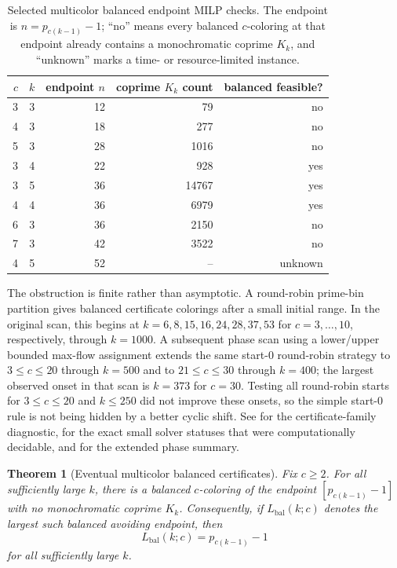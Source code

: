 \documentclass[11pt]{article}
\theoremstyle{plain}
\newtheorem{theorem}{Theorem}[section]
\theoremstyle{definition}
\theoremstyle{remark}
\begin{document}
\begin{table}[htbp]
\centering
\caption{Selected multicolor balanced endpoint MILP checks.  The endpoint
is $n=p_{c(k-1)}-1$; ``no'' means every balanced $c$-coloring at that
endpoint already contains a monochromatic coprime $K_k$, and ``unknown'' marks
a time- or resource-limited instance.}
\label{tab:balanced-multicolor-endpoint}
\small
\begin{tabular}{@{}rrrrr@{}}
\toprule
$c$ & $k$ & endpoint $n$ & coprime $K_k$ count & balanced feasible? \\
\midrule
3 & 3 & 12 & 79 & no \\
4 & 3 & 18 & 277 & no \\
5 & 3 & 28 & 1016 & no \\
3 & 4 & 22 & 928 & yes \\
3 & 5 & 36 & 14767 & yes \\
4 & 4 & 36 & 6979 & yes \\
6 & 3 & 36 & 2150 & no \\
7 & 3 & 42 & 3522 & no \\
4 & 5 & 52 & -- & unknown \\
\bottomrule
\end{tabular}

\end{table}

The obstruction is finite rather than asymptotic.  A round-robin prime-bin
partition gives balanced certificate colorings after a small initial range.
In the original scan, this begins at $k=6,8,15,16,24,28,37,53$ for
$c=3,\ldots,10$, respectively, through $k=1000$.  A subsequent phase scan
using a lower/upper bounded max-flow assignment extends the same start-$0$
round-robin strategy to $3\le c\le20$ through $k=500$ and to
$21\le c\le30$ through $k=400$; the largest observed onset in that scan is
$k=373$ for $c=30$.  Testing all round-robin starts for $3\le c\le20$ and
$k\le250$ did not improve these onsets, so the simple start-$0$ rule is not
being hidden by a better cyclic shift.  See  for the
certificate-family diagnostic,
 for the exact small solver statuses
that were computationally decidable, and 
for the extended phase summary.

\begin{theorem}[Eventual multicolor balanced certificates]
\label{thm:eventual-multicolor-balanced}
Fix $c\ge2$.  For all sufficiently large $k$, there is a balanced
$c$-coloring of the endpoint $[p_{c(k-1)}-1]$ with no monochromatic coprime
$K_k$.  Consequently, if $L_{\mathrm{bal}}(k;c)$ denotes the largest such
balanced avoiding endpoint, then
\[
  L_{\mathrm{bal}}(k;c)=p_{c(k-1)}-1
\]
for all sufficiently large $k$.
\end{theorem}
\end{document}
